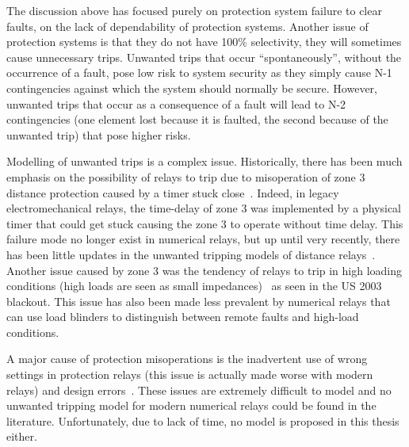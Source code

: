 The discussion above has focused purely on protection system failure to clear faults, \ie on the lack of dependability of protection systems. Another issue of protection systems is that they do not have 100\% selectivity, \ie they will sometimes cause unnecessary trips. Unwanted trips that occur ``spontaneously'', \ie without the occurrence of a fault, pose low risk to system security as they simply cause N-1 contingencies against which the system should normally be secure. However, unwanted trips that occur as a consequence of a fault will lead to N-2 contingencies (one element lost because it is faulted, the second because of the unwanted trip) that pose higher risks.

Modelling of unwanted trips is a complex issue. Historically, there has been much emphasis on the possibility of relays to trip due to misoperation of zone 3 distance protection caused by a timer stuck close~\cite{ZoneVulnerability, OriginalManchesterModel}. Indeed, in legacy electromechanical relays, the time-delay of zone 3 was implemented by a physical timer that could get stuck causing the zone 3 to operate without time delay. This failure mode no longer exist in numerical relays, but up until very recently, there has been little updates in the unwanted tripping models of distance relays~\cite{Alexandre_PMAPS}. Another issue caused by zone 3 was the tendency of relays to trip in high loading conditions (high loads are seen as small impedances)~\cite{3rdZoneRevisited} as seen in the US 2003 blackout. This issue has also been made less prevalent by numerical relays that can use load blinders to distinguish between remote faults and high-load conditions.

A major cause of protection misoperations is the inadvertent use of wrong settings in protection relays (this issue is actually made worse with modern relays) and design errors~\cite{ProtectionMisoperationsBian2012}. These issues are extremely difficult to model and no unwanted tripping model for modern numerical relays could be found in the literature. Unfortunately, due to lack of time, no model is proposed in this thesis either.

